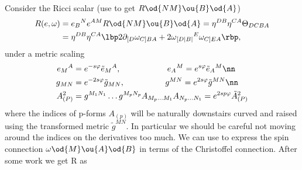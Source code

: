 Consider the Ricci scalar (use  to get $R\od{NM}\ou{B}\od{A}$)
\begin{align}
R(e,\omega) &= e{_B}^Ne^{AM}R\od{NM}\ou{B}\od{A} = \eta^{DB}\eta^{CA}\Theta_{DCBA} \nonumber \\
&= \eta^{DB}\eta^{CA}\lbp 2\partial_{[D}\omega_{C]BA} + 2\omega{_{[D|B|}}^E\omega_{C]EA} \rbp,
\end{align}
under a metric scaling
\begin{align}
e{_{M}}^A &= e^{-s\varphi}\tilde e{_{M}}^A,\hspace{2cm}e{_{A}}^M = e^{s\varphi}\tilde e{_{A}}^M\nn\\
g{_{MN}} &= e^{-2s\varphi}\tilde g_{MN},\hspace{1.75cm}g{^{MN}} = e^{2s\varphi}\tilde g^{MN}\nn\\
A_{(P)}^2 &= g^{M_1N_1}\dots g^{M_pN_p}A_{M_p\dots M_1}A_{N_p\dots N_1} = e^{2sp\varphi} \tilde A_{(P)}^2
\end{align}
where the indices of p-forms $A_{(p)}$ will be naturally downstairs curved and raised using the transformed metric $\tilde g^{MN}$. In particular we should be careful not moving around the indices on the derivatives too much.  
We can use  to express the spin connection $\omega\od{M}\ou{A}\od{B}$ in terms of the Christoffel connection.
After some work we get R as

